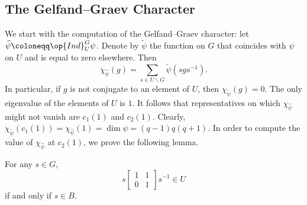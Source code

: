 \documentclass[../main.tex]{subfiles}
\begin{document}
\subsection{The Gelfand--Graev Character}
We start with the computation of the Gelfand--Graev character: let $\widehat\psi\coloneqq\op{Ind}^G_U\psi$. Denote by $\widetilde\psi$ the function on $G$ that coincides with $\psi$ on $U$ and is equal to zero elsewhere. Then
\[\chi_{\widehat\psi}(g)=\sum_{s\in U\backslash G}\widetilde\psi\left(sgs^{-1}\right).\]
In particular, if $g$ is not conjugate to an element of $U$, then $\chi_{\widetilde\psi}(g)=0$. The only eigenvalue of the elements of $U$ is $1$. It follows that representatives on which $\chi_{\widehat\psi}$ might not vanish are $c_1(1)$ and $c_2(1)$. Clearly, $\chi_{\widetilde\psi}(c_1(1))=\chi_{\widehat\psi}(1)=\dim\widehat\psi=(q-1)q(q+1)$. In order to compute the value of $\chi_{\widehat\psi}$ at $c_2(1)$, we prove the following lemma.
\begin{lemma} \label{lem:conj-classes-of-t}
	For any $s\in G$,
	\[s\begin{bmatrix}
		1 & 1 \\
		0 & 1
	\end{bmatrix}s^{-1}\in U\]
	if and only if $s\in B$.
\end{lemma}
\end{document}
